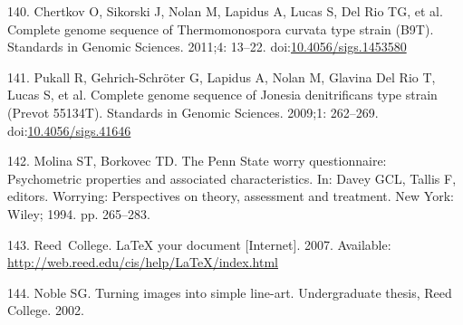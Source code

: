 \documentclass[12pt,twoside]{reedthesis}
\begin{document}
  \hypertarget{ref-chertkovux5fcompleteux5f2011}{}
  140. Chertkov O, Sikorski J, Nolan M, Lapidus A, Lucas S, Del Rio TG, et
  al. Complete genome sequence of Thermomonospora curvata type strain
  (B9T). Standards in Genomic Sciences. 2011;4: 13--22.
  doi:\href{https://doi.org/10.4056/sigs.1453580}{10.4056/sigs.1453580}
  
  \hypertarget{ref-pukallux5fcompleteux5f2009}{}
  141. Pukall R, Gehrich-Schröter G, Lapidus A, Nolan M, Glavina Del Rio
  T, Lucas S, et al. Complete genome sequence of Jonesia denitrificans
  type strain (Prevot 55134T). Standards in Genomic Sciences. 2009;1:
  262--269.
  doi:\href{https://doi.org/10.4056/sigs.41646}{10.4056/sigs.41646}
  
  \hypertarget{ref-Molina1994}{}
  142. Molina ST, Borkovec TD. The Penn State worry questionnaire:
  Psychometric properties and associated characteristics. In: Davey GCL,
  Tallis F, editors. Worrying: Perspectives on theory, assessment and
  treatment. New York: Wiley; 1994. pp. 265--283.
  
  \hypertarget{ref-reedweb2007}{}
  143. Reed~College. LaTeX your document {[}Internet{]}. 2007. Available:
  \url{http://web.reed.edu/cis/help/LaTeX/index.html}
  
  \hypertarget{ref-noble2002}{}
  144. Noble SG. Turning images into simple line-art. Undergraduate
  thesis, Reed College. 2002.


\end{document}
